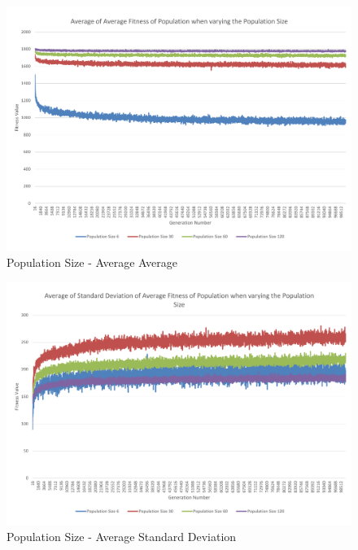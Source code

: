 \begin{landscape}
\begin{figure}[thbp]
	\centerline{\includegraphics[height=0.945\textwidth]{figures/CircleTests/PopulationSize/CircleTestsPopulationAverageAverage.pdf}}
	\caption{Population Size - Average Average}
\end{figure}
\end{landscape}

\begin{landscape}
\begin{figure}[thbp]
	\centerline{\includegraphics[height=0.945\textwidth]{figures/CircleTests/PopulationSize/CircleTestsPopulationAverageStandardDeviation.pdf}}
	\caption{Population Size - Average Standard Deviation}
\end{figure}
\end{landscape}

